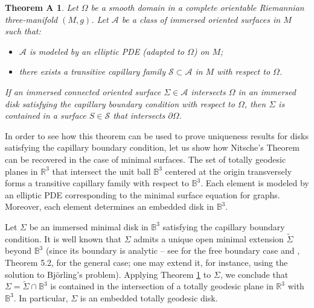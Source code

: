 \documentclass[11pt,reqno]{amsart}
\newtheorem*{theoremA}{Theorem A}
\begin{document}
\begin{theoremA}\label{int.theo.1}
Let $\Omega$ be a smooth domain in a complete orientable Riemannian three-manifold $(M,g)$. Let $\mathcal{A}$ be a class of immersed oriented surfaces in $M$ such that:
    \begin{itemize}
        \item $\mathcal{A}$ is modeled by an elliptic PDE (adapted to $\Omega$) on $M$;
        \item there exists a transitive capillary family $\mathcal{S}\subset\mathcal{A}$ in $M$ with respect to $\Omega$.
    \end{itemize}
 If an immersed connected oriented surface $\Sigma\in \mathcal{A}$ intersects $\Omega$ in an immersed disk satisfying the capillary boundary condition with respect to $\Omega$, then $\Sigma$ is contained in a surface $S\in \mathcal{S}$ that intersects $\partial \Omega$.
\end{theoremA}

In order to see how this theorem can be used to prove uniqueness results for disks satisfying the capillary boundary condition, let us show how Nitsche's Theorem can be recovered in the case of minimal surfaces. The set of totally geodesic planes in $\mathbb{R}^3$ that intersect the unit ball $\mathbb{B}^3$ centered at the origin transversely forms a transitive capillary family with respect to $\mathbb{B}^3$. Each element is modeled by an elliptic PDE corresponding to the minimal surface equation for graphs. Moreover, each element determines an embedded disk in $\mathbb{B}^3$. 

Let $\Sigma$ be an immersed minimal disk in $\mathbb{B}^3$ satisfying the capillary boundary condition. It is well known that $\Sigma$ admits a unique open minimal extension $\tilde{\Sigma}$ beyond $\mathbb{B}^3$ (since its boundary is analytic – see \cite{Lew} for the free boundary case and \cite{KinNirSpr}, Theorem 5.2, for the general case; one may extend it, for instance, using the solution to Bj\"orling's problem). Applying Theorem \ref{int.theo.1} to $\Sigma$, we conclude that $\Sigma=\tilde{\Sigma}\cap \mathbb{B}^3$ is contained in the intersection of a totally geodesic plane in $\mathbb{R}^3$ with $\mathbb{B}^3$. In particular, $\Sigma$ is an embedded totally geodesic disk.
\end{document}
